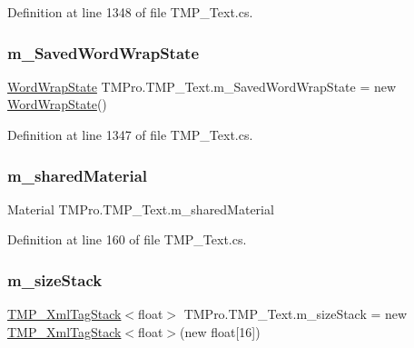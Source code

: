 Definition at line 1348 of file T\+M\+P\+\_\+\+Text.\+cs.

\mbox{\label{class_t_m_pro_1_1_t_m_p___text_ab5a8796132737fab15ed45b5ebd8a166}} 
\subsubsection{\texorpdfstring{m\_SavedWordWrapState}{m\_SavedWordWrapState}}
{\footnotesize\ttfamily \mbox{\hyperlink{struct_t_m_pro_1_1_word_wrap_state}{Word\+Wrap\+State}} T\+M\+Pro.\+T\+M\+P\+\_\+\+Text.\+m\+\_\+\+Saved\+Word\+Wrap\+State = new \mbox{\hyperlink{struct_t_m_pro_1_1_word_wrap_state}{Word\+Wrap\+State}}()\hspace{0.3cm}{\ttfamily [protected]}}



Definition at line 1347 of file T\+M\+P\+\_\+\+Text.\+cs.

\mbox{\label{class_t_m_pro_1_1_t_m_p___text_ad2365ba31daa210643db257aa6ce3279}} 
\subsubsection{\texorpdfstring{m\_sharedMaterial}{m\_sharedMaterial}}
{\footnotesize\ttfamily Material T\+M\+Pro.\+T\+M\+P\+\_\+\+Text.\+m\+\_\+shared\+Material\hspace{0.3cm}{\ttfamily [protected]}}



Definition at line 160 of file T\+M\+P\+\_\+\+Text.\+cs.

\mbox{\label{class_t_m_pro_1_1_t_m_p___text_adab7fa99845b471b539790ea7b647755}} 
\subsubsection{\texorpdfstring{m\_sizeStack}{m\_sizeStack}}
{\footnotesize\ttfamily \mbox{\hyperlink{struct_t_m_pro_1_1_t_m_p___xml_tag_stack}{T\+M\+P\+\_\+\+Xml\+Tag\+Stack}}$<$float$>$ T\+M\+Pro.\+T\+M\+P\+\_\+\+Text.\+m\+\_\+size\+Stack = new \mbox{\hyperlink{struct_t_m_pro_1_1_t_m_p___xml_tag_stack}{T\+M\+P\+\_\+\+Xml\+Tag\+Stack}}$<$float$>$(new float\mbox{[}16\mbox{]})\hspace{0.3cm}{\ttfamily [protected]}}




